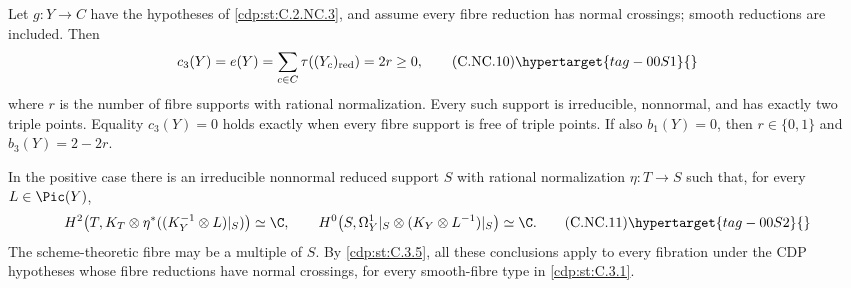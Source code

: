 \begin{proposition}\hypertarget{tag-01CC}{}\label{cdp:st:C.2.NC.5}

Let $g:Y\to C$ have the hypotheses of \ref{cdp:st:C.2.NC.3}, and assume every fibre reduction has normal crossings; smooth reductions are included. Then
\[
 c_3(Y)=e(Y)=\sum_{c\in C}\tau((Y_c)_{\rm red})=2r\ge0,
 \tag{C.NC.10}\hypertarget{tag-00S1}{}\label{cdp:eq:C.NC.10}
\]
where $r$ is the number of fibre supports with rational normalization. Every such support is irreducible, nonnormal, and has exactly two triple points. Equality $c_3(Y)=0$ holds exactly when every fibre support is free of triple points. If also $b_1(Y)=0$, then $r\in\{0,1\}$ and $b_3(Y)=2-2r$.

In the positive case there is an irreducible nonnormal reduced support $S$ with rational normalization $\eta:T\to S$ such that, for every $L\in\Pic(Y)$,
\[
 H^2\!\left(T,K_T\otimes\eta^*((K_Y^{-1}\otimes L)|_S)\right)\simeq\C,
 \qquad
 H^0\!\left(S,\Omega_Y^1|_S\otimes(K_Y\otimes L^{-1})|_S\right)\simeq\C.
 \tag{C.NC.11}\hypertarget{tag-00S2}{}\label{cdp:eq:C.NC.11}
\]
The scheme-theoretic fibre may be a multiple of $S$. By \ref{cdp:st:C.3.5}, all these conclusions apply to every fibration under the CDP hypotheses whose fibre reductions have normal crossings, for every smooth-fibre type in \ref{cdp:st:C.3.1}.
\end{proposition}



